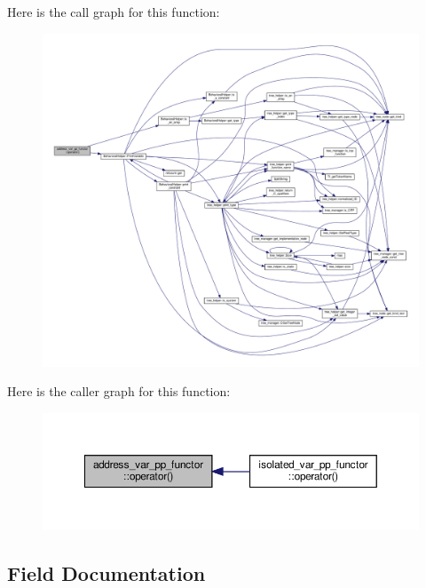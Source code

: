 Here is the call graph for this function\+:
\nopagebreak
\begin{figure}[H]
\begin{center}
\leavevmode
\includegraphics[width=350pt]{d2/d0f/structaddress__var__pp__functor_a53bd3e80f4e77c018125c61d54001744_cgraph}
\end{center}
\end{figure}
Here is the caller graph for this function\+:
\nopagebreak
\begin{figure}[H]
\begin{center}
\leavevmode
\includegraphics[width=350pt]{d2/d0f/structaddress__var__pp__functor_a53bd3e80f4e77c018125c61d54001744_icgraph}
\end{center}
\end{figure}


\subsection{Field Documentation}
\mbox{\label{structaddress__var__pp__functor_a59937bfbf38b56b7643f2638431802ed}} 
